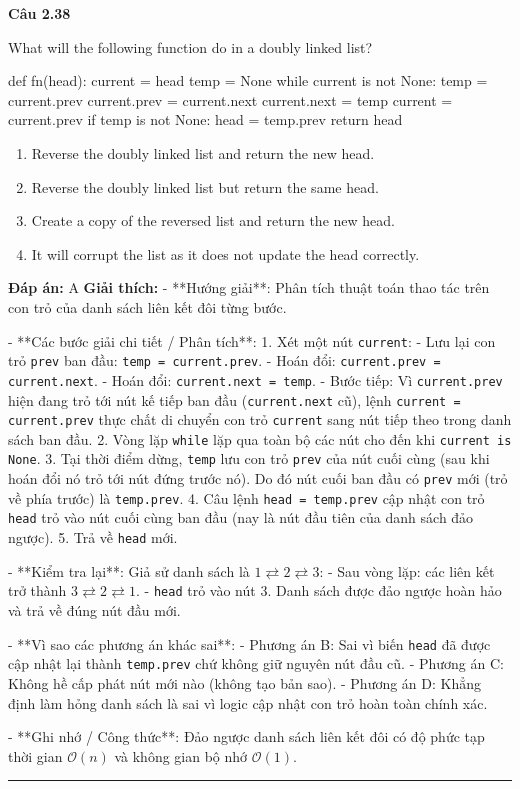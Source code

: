 \documentclass[11pt,a4paper]{article}
\newenvironment{question}[1]{%
  \par\vspace{1em}\noindent\textbf{\large Câu #1}\par\vspace{0.4em}
}{%
  \par\vspace{1em}\hrule\vspace{0.6em}
}
\newenvironment{choices}{%
  \begin{enumerate}[label=\textbf{\Alph*.},leftmargin=2.2em,itemsep=2pt,topsep=3pt]
}{%
  \end{enumerate}
}
\newcommand{\choice}{\item}
\newenvironment{codebox}{%
  \begin{tcolorbox}[colback=gray!8!white,colframe=gray!50!black,arc=1.5mm,boxrule=0.6pt,left=3mm,right=3mm,top=2.5mm,bottom=2.5mm]
  \ttfamily\small
}{%
  \end{tcolorbox}
}
\begin{document}
\begin{question}{2.38}
What will the following function do in a doubly linked list?
\begin{codebox}
def fn(head):
    current = head
    temp = None
    while current is not None:
        temp = current.prev
        current.prev = current.next
        current.next = temp
        current = current.prev
    if temp is not None:
        head = temp.prev
    return head
\end{codebox}
\begin{choices}
\choice Reverse the doubly linked list and return the new head.
\choice Reverse the doubly linked list but return the same head.
\choice Create a copy of the reversed list and return the new head.
\choice It will corrupt the list as it does not update the head correctly.
\end{choices}
\textbf{Đáp án:} A
\textbf{Giải thích:} - **Hướng giải**:
Phân tích thuật toán thao tác trên con trỏ của danh sách liên kết đôi từng bước.


- **Các bước giải chi tiết / Phân tích**:
1. Xét một nút \texttt{current}:
   - Lưu lại con trỏ \texttt{prev} ban đầu: \texttt{temp = current.prev}.
   - Hoán đổi: \texttt{current.prev = current.next}.
   - Hoán đổi: \texttt{current.next = temp}.
   - Bước tiếp: Vì \texttt{current.prev} hiện đang trỏ tới nút kế tiếp ban đầu (\texttt{current.next} cũ), lệnh \texttt{current = current.prev} thực chất di chuyển con trỏ \texttt{current} sang nút tiếp theo trong danh sách ban đầu.
2. Vòng lặp \texttt{while} lặp qua toàn bộ các nút cho đến khi \texttt{current is None}.
3. Tại thời điểm dừng, \texttt{temp} lưu con trỏ \texttt{prev} của nút cuối cùng (sau khi hoán đổi nó trỏ tới nút đứng trước nó). Do đó nút cuối ban đầu có \texttt{prev} mới (trỏ về phía trước) là \texttt{temp.prev}.
4. Câu lệnh \texttt{head = temp.prev} cập nhật con trỏ \texttt{head} trỏ vào nút cuối cùng ban đầu (nay là nút đầu tiên của danh sách đảo ngược).
5. Trả về \texttt{head} mới.


- **Kiểm tra lại**:
Giả sử danh sách là \(1 \rightleftarrows 2 \rightleftarrows 3\):
- Sau vòng lặp: các liên kết trở thành \(3 \rightleftarrows 2 \rightleftarrows 1\).
- \texttt{head} trỏ vào nút 3. Danh sách được đảo ngược hoàn hảo và trả về đúng nút đầu mới.


- **Vì sao các phương án khác sai**:
- Phương án B: Sai vì biến \texttt{head} đã được cập nhật lại thành \texttt{temp.prev} chứ không giữ nguyên nút đầu cũ.
- Phương án C: Không hề cấp phát nút mới nào (không tạo bản sao).
- Phương án D: Khẳng định làm hỏng danh sách là sai vì logic cập nhật con trỏ hoàn toàn chính xác.


- **Ghi nhớ / Công thức**:
Đảo ngược danh sách liên kết đôi có độ phức tạp thời gian \(\mathcal{O}(n)\) và không gian bộ nhớ \(\mathcal{O}(1)\).
\end{question}
\end{document}
